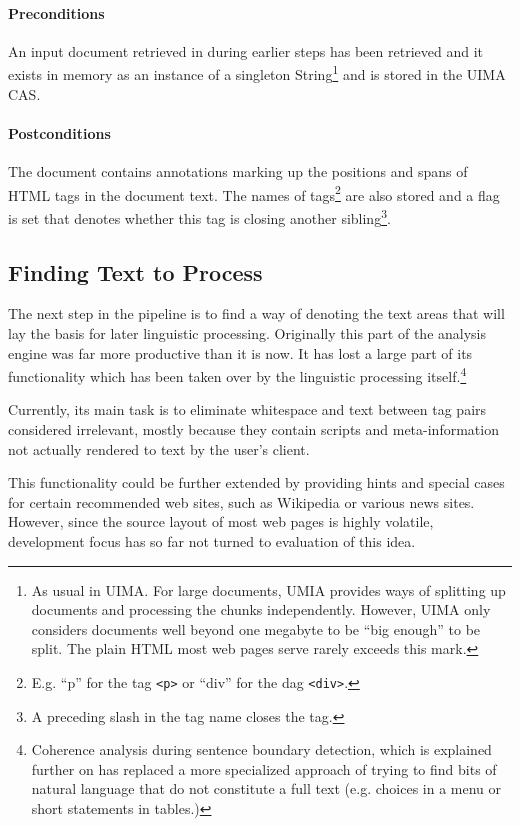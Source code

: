 \documentclass[12pt]{scrartcl}
\begin{document}
\paragraph{Preconditions} An input document retrieved in during earlier steps
has been retrieved and it exists in memory as an instance of a singleton
String\footnote{As usual in UIMA. For large documents, UMIA provides ways of
splitting up documents and processing the chunks independently. However, UIMA
only considers documents well beyond one megabyte to be ``big enough'' to be
split. The plain HTML most web pages serve rarely exceeds this mark.}   and is
stored in the UIMA CAS.
\paragraph{Postconditions} The document contains annotations marking up the
positions and spans of HTML tags in the document text. The names of
tags\footnote{E.g. ``p'' for the tag \texttt{<p>} or ``div'' for the dag
\texttt{<div>}.} are
also stored and a flag is set that denotes whether this tag is
closing another sibling\footnote{A preceding slash in the tag name closes the tag.}.

\subsection{Finding Text to Process}

The next step in the pipeline is to find a way of denoting the text areas that
will lay the basis for later linguistic processing. Originally this part of the
analysis engine was far more productive than it is now. It has lost a large part of its
functionality which has been taken over by the linguistic processing
itself.\footnote{Coherence analysis during sentence boundary detection, which is
explained further on has replaced a more specialized approach of trying to find
bits of natural language that do not constitute a full text (e.g. choices in a
menu or short statements in tables.)}

Currently, its main task is to eliminate whitespace and text between tag pairs
considered irrelevant, mostly because they contain scripts and meta-information
not actually rendered to text by the user's client.

This functionality could be further extended by providing hints and special
cases for certain recommended web sites, such as Wikipedia or various news
sites. However, since the source layout of most web pages is highly volatile,
development focus has so far not turned to evaluation of this idea.
\end{document}
